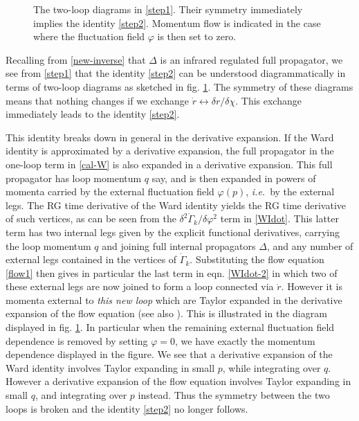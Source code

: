 \documentclass[11pt]{book} %
\newcommand\ie{\textit{i.e.}\ }
\numberwithin{equation}{chapter}
\begin{document}
\begin{figure}
  \begin{center}
    
  \end{center}
  \caption{
    The two-loop diagrams in \eqref{step1}.
    Their symmetry immediately implies the identity \eqref{step2}.
    Momentum flow is indicated in the case where the fluctuation field $\varphi$ is then set to zero.
  }
  \label{fig:two-loop}
\end{figure}
Recalling from \eqref{new-inverse} that $\Delta$ is an infrared regulated full propagator,
we see from \eqref{step1} that the identity \eqref{step2} can be understood diagrammatically
in terms of two-loop diagrams as sketched in fig. \ref{fig:two-loop}.
The symmetry of these diagrams means that nothing changes if we
exchange $\dot{r}\leftrightarrow\delta r/\delta\chi$.
This exchange immediately leads to the identity \eqref{step2}.

This identity breaks down in general in the derivative expansion.
If the Ward identity is approximated by a derivative expansion,
the full propagator in the one-loop term in \eqref{cal-W} is also expanded in a derivative expansion.
This full propagator has loop momentum $q$ say,
and is then expanded in powers of momenta carried by the external fluctuation
field $\varphi(p)$, \ie by the external legs.
The RG time derivative of the Ward identity yields the RG time derivative of such vertices,
as can be seen from the $\delta^2\dot{\Gamma}_k/\delta\varphi^2$ term  in \eqref{WIdot}.
This latter term has two internal legs given by the explicit functional derivatives,
carrying the loop momentum $q$ and joining full internal propagators $\Delta$,
and any number of external legs contained in the vertices of $\dot{\Gamma}_k$.
Substituting the flow equation \eqref{flow1} then gives in particular the last term in
eqn. \eqref{WIdot-2} in which two of these external legs are now joined to form a loop
connected via $\dot{r}$.  However it is momenta external to \emph{this new loop} which are
Taylor expanded in the derivative expansion of the flow equation
(see also \cite{Morris:1999ba, Morris:2000hm}).
This is illustrated in the diagram displayed in fig. \ref{fig:two-loop}.
In particular when the remaining external fluctuation field dependence is removed by setting $\varphi=0$,
we have exactly the momentum dependence displayed in the figure.
We see that a derivative expansion of the Ward identity involves Taylor expanding in small $p$,
while integrating over $q$.
However a derivative expansion of the flow equation involves Taylor expanding in small $q$,
and integrating over $p$ instead.
Thus the symmetry between the two loops is broken and the identity \eqref{step2} no longer follows.
\end{document}
